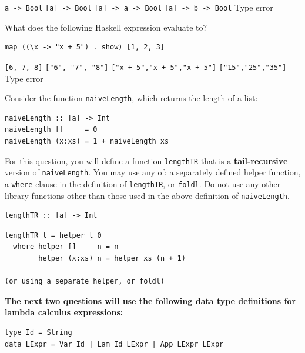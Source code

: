 \documentclass[addpoints]{exam}
\begin{document}
\begin{questions}
\begin{choices}
  \CorrectChoice \texttt{a -> Bool}
  \choice \texttt{[a] -> Bool}
  \choice \texttt{[a] -> a -> Bool}
  \choice \texttt{[a] -> b -> Bool}
  \choice Type error
\end{choices}

\newpage

\question[5] What does the following Haskell expression evaluate to?
\begin{verbatim}
map ((\x -> "x + 5") . show) [1, 2, 3]
\end{verbatim}

\begin{choices}
  \choice \texttt{[6, 7, 8]}
  \choice \texttt{["6", "7", "8"]}
  \CorrectChoice \texttt{["x + 5","x + 5","x + 5"]}
  \choice \verb|["15","25","35"]|
  \choice Type error
\end{choices}

\question[10] Consider the function \texttt{naiveLength}, which returns the length of a list:

\begin{verbatim}
naiveLength :: [a] -> Int
naiveLength []     = 0
naiveLength (x:xs) = 1 + naiveLength xs
\end{verbatim}

For this question, you will define a function \texttt{lengthTR} that is a \textbf{tail-recursive} version of \texttt{naiveLength}.  You may use any of: a separately defined helper function, a \texttt{where} clause in the definition of \texttt{lengthTR}, or \texttt{foldl}.  Do not use any other library functions other than those used in the above definition of \texttt{naiveLength}.

\begin{verbatim}
lengthTR :: [a] -> Int
\end{verbatim}
\begin{solutionorbox}[\stretch{1}]
\begin{verbatim}
lengthTR l = helper l 0
  where helper []     n = n
        helper (x:xs) n = helper xs (n + 1)

(or using a separate helper, or foldl)
\end{verbatim}
\end{solutionorbox}

\newpage

\noindent \textbf{The next two questions will use the following data type definitions for lambda calculus expressions:}

\begin{verbatim}
type Id = String
data LExpr = Var Id | Lam Id LExpr | App LExpr LExpr
\end{verbatim}


\end{questions}
\end{document}
